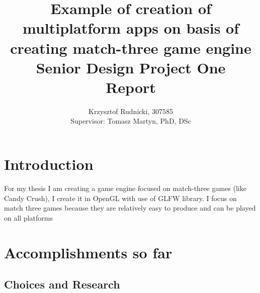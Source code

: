 \documentclass[12pt]{article}
\title{Example of creation of multiplatform apps on basis of creating match-three game engine \\ Senior Design Project One \\ Report}
\author{Krzysztof Rudnicki, 307585 \\ Supervisor: Tomasz Martyn, PhD, DSc}
\begin{document}
\maketitle

\section{Introduction}
For my thesis I am creating a game engine focused on match-three games (like Candy Crush), I create it in OpenGL with use of GLFW library. I focus on match three games because they are relatively easy to produce and can be played on all platforms
\section{Accomplishments so far}
\subsection{Choices and Research}
\end{document}
